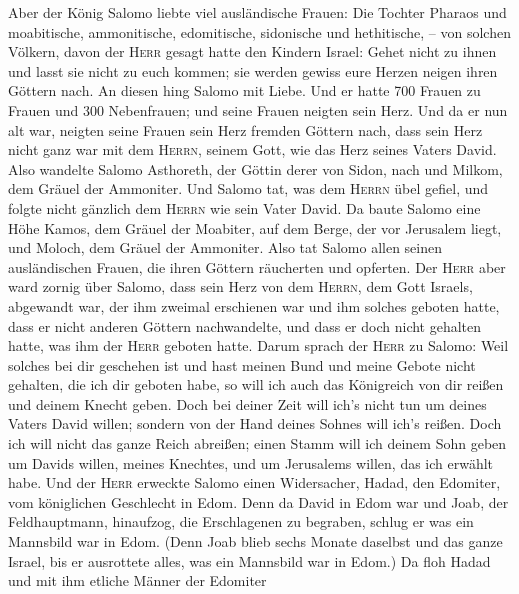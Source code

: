  Aber der König Salomo liebte viel ausländische Frauen:
Die Tochter Pharaos und moabitische, ammonitische, edomitische,
sidonische und hethitische, --  von solchen Völkern, davon
der \textsc{Herr} gesagt hatte den Kindern Israel: Gehet nicht zu ihnen
und lasst sie nicht zu euch kommen; sie werden gewiss eure Herzen neigen
ihren Göttern nach. An diesen hing Salomo mit Liebe.  Und
er hatte 700 Frauen zu Frauen und 300 Nebenfrauen; und seine Frauen
neigten sein Herz.  Und da er nun alt war, neigten seine
Frauen sein Herz fremden Göttern nach, dass sein Herz nicht ganz war mit
dem \textsc{Herrn}, seinem Gott, wie das Herz seines Vaters David.
 Also wandelte Salomo Asthoreth, der Göttin derer von
Sidon, nach und Milkom, dem Gräuel der Ammoniter.  Und
Salomo tat, was dem \textsc{Herrn} übel gefiel, und folgte nicht
gänzlich dem \textsc{Herrn} wie sein Vater David.  Da
baute Salomo eine Höhe Kamos, dem Gräuel der Moabiter, auf dem Berge,
der vor Jerusalem liegt, und Moloch, dem Gräuel der Ammoniter.
 Also tat Salomo allen seinen ausländischen Frauen, die
ihren Göttern räucherten und opferten.  Der \textsc{Herr}
aber ward zornig über Salomo, dass sein Herz von dem \textsc{Herrn}, dem
Gott Israels, abgewandt war, der ihm zweimal erschienen war
 und ihm solches geboten hatte, dass er nicht anderen
Göttern nachwandelte, und dass er doch nicht gehalten hatte, was ihm der
\textsc{Herr} geboten hatte.  Darum sprach der
\textsc{Herr} zu Salomo: Weil solches bei dir geschehen ist und hast
meinen Bund und meine Gebote nicht gehalten, die ich dir geboten habe,
so will ich auch das Königreich von dir reißen und deinem Knecht geben.
 Doch bei deiner Zeit will ich's nicht tun um deines
Vaters David willen; sondern von der Hand deines Sohnes will ich's
reißen.  Doch ich will nicht das ganze Reich abreißen;
einen Stamm will ich deinem Sohn geben um Davids willen, meines
Knechtes, und um Jerusalems willen, das ich erwählt habe.
 Und der \textsc{Herr} erweckte Salomo einen Widersacher,
Hadad, den Edomiter, vom königlichen Geschlecht in Edom. 
Denn da David in Edom war und Joab, der Feldhauptmann, hinaufzog, die
Erschlagenen zu begraben, schlug er was ein Mannsbild war in Edom.
 (Denn Joab blieb sechs Monate daselbst und das ganze
Israel, bis er ausrottete alles, was ein Mannsbild war in Edom.)
 Da floh Hadad und mit ihm etliche Männer der Edomiter
